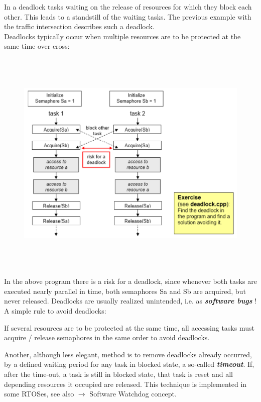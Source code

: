 In a deadlock tasks waiting on the release of resources for which they block each other. This leads to a standstill of the waiting tasks. The previous example with the traffic intersection describes such a deadlock.\\

Deadlocks typically occur when multiple resources are to be protected at the same time over cross:

 	\begin{figure}[h]
    \centering
    \includegraphics[width=12cm, height=11cm]{Images/image108.png}
    \label{fig:Fig 54}
    \end{figure}

In the above program there is a risk for a deadlock, since whenever both tasks are executed nearly parallel in time, both semaphores Sa and Sb are acquired, but never released. Deadlocks are usually realized unintended, i.e. as \textbf{\textit{software bugs}} !\\

A simple rule to avoid deadlocks:

\begin{tcolorbox}[colback=blue!5!white,colframe=blue!75!black]
	If several resources are to be protected at the same time, all accessing tasks must acquire / release semaphores in the same order to avoid deadlocks.
\end{tcolorbox}

Another, although less elegant, method is to remove deadlocks already occurred, by a defined waiting period for any task in blocked state, a so-called \textbf{\textit{timeout}}. If, after the time-out, a task is still in blocked state, that task is reset and all depending resources it occupied are released. This technique is implemented in some RTOSes, see also $\rightarrow$ Software Watchdog concept.

